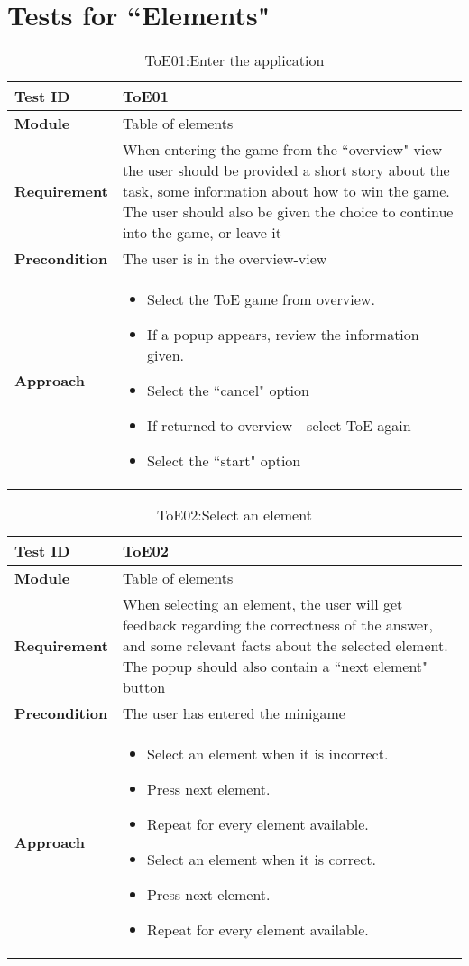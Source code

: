 \section{Tests for ``Elements"}
\begin{table}[!h]
\caption{ToE01:Enter the application}
\begin{tabular}{ |p{7cm}|p{7cm}| }
\hline
\textbf {Test ID} & {ToE01} \\ \hline
\textbf {Module} & {Table of elements} \\ \hline
\textbf {Requirement} & {When entering the game from the ``overview"-view the user should be provided a short story about the task, some information about how to win the game. The user should also be given the choice to continue into the game, or leave it} \\ \hline
\textbf {Precondition} & {The user is in the overview-view} \\ \hline
\textbf {Approach} & {\begin{itemize}
    \item Select the ToE game from overview.
    \item If a popup appears, review the information given.
    \item Select the ``cancel" option
    \item If returned to overview - select ToE again
    \item Select the ``start" option
\end{itemize}} \\ \hline
\end{tabular}
\end{table}

\begin{table}[!h]
\caption{ToE02:Select an element}
\begin{tabular}{ |p{7cm}|p{7cm}| }
\hline
\textbf {Test ID} & {ToE02} \\ \hline
\textbf {Module} & {Table of elements} \\ \hline
\textbf {Requirement} & {When selecting an element, the user will get feedback regarding the correctness of the answer, and some relevant facts about the selected element. The popup should also contain a ``next element" button} \\ \hline
\textbf {Precondition} & {The user has entered the minigame} \\ \hline
\textbf {Approach} & {\begin{itemize}
    \item Select an element when it is incorrect.
    \item Press next element.
    \item Repeat for every element available.
    \item Select an element when it is correct.
    \item Press next element.
    \item Repeat for every element available.
\end{itemize}} \\ \hline
\end{tabular}
\end{table}


